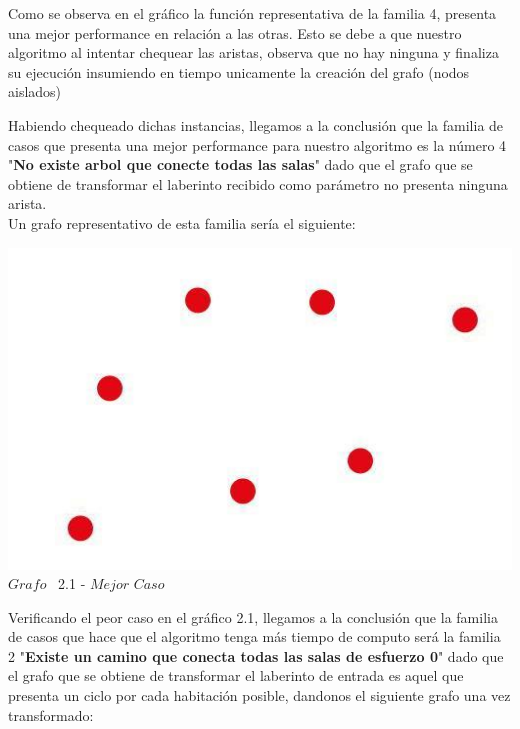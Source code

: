 Como se observa en el gr\'afico la funci\'on representativa de la familia 4, presenta una mejor performance en relaci\'on a las otras. Esto se debe a que nuestro algoritmo al intentar chequear las aristas, observa que no hay ninguna y finaliza su ejecuci\'on insumiendo en tiempo unicamente la creaci\'on del grafo (nodos aislados)

Habiendo chequeado dichas instancias, llegamos a la conclusi\'on que la familia de casos que presenta una mejor performance para nuestro algoritmo
es la número 4 "\textbf{No existe arbol que conecte todas las salas}" dado que el grafo que se obtiene de transformar el laberinto recibido como par\'ametro no presenta ninguna arista.\\

Un grafo representativo de esta familia ser\'ia el siguiente:

\vspace*{0.3cm} \vspace*{0.3cm}
  \begin{center}
 \includegraphics[scale=0.5]{./EJ2/grafoSinEjes.jpeg}
 \\{$Grafo$ \ 2.1 - $Mejor$ $Caso$}
  \end{center}
  \vspace*{0.3cm}

Verificando el peor caso en el gráfico 2.1, llegamos a la conclusi\'on que la familia de casos que hace que el algoritmo tenga más tiempo de computo ser\'a la familia 2 "\textbf{Existe un camino que conecta todas las salas de esfuerzo 0}" dado que el grafo que se obtiene de transformar el laberinto de entrada es aquel que presenta un ciclo por cada habitaci\'on posible, dandonos el siguiente grafo una vez transformado:\\

